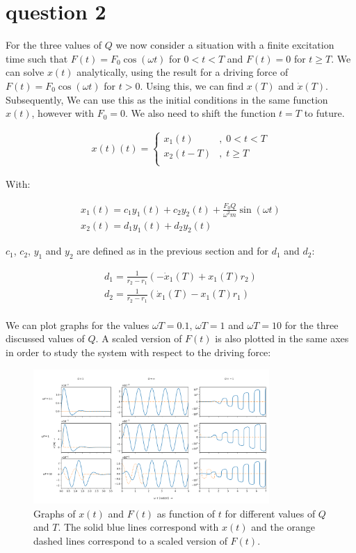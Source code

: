 \section{question 2}

For the three values of $Q$ we now consider a situation with a finite excitation time such that $F(t) = F_0 \cos(\omega t)$ for $0 < t < T$ and $F(t) = 0$ for $t \geq T$. We can solve $x(t)$ analytically, using the result for a driving force of $F(t) = F_0 \cos(\omega t)$ for $t > 0$. Using this, we can find $x(T)$ and $\dot{x}(T)$. Subsequently, We can use this as the initial conditions in the same function $x(t)$, however with $F_0 = 0$. We also need to shift the function $t=T$ to future.

\begin{align*}
	x(t)(t) = \begin{cases}
		x_1(t) & , \; 0 < t < T \\
		x_2(t-T) & , \; t \geq T \\
		\end{cases}
\end{align*}

With:

\begin{align*}
	x_1(t) = c_1 y_1(t) + c_2 y_2(t) + \frac{F_0 Q}{\omega^2 m}\sin(\omega t) \\
	x_2(t) = d_1 y_1(t) + d_2 y_2(t)
\end{align*}

$c_1$, $c_2$, $y_1$ and $y_2$ are defined as in the previous section and for $d_1$ and $d_2$:

\begin{align*}
	d_1 = \frac{1}{r_2-r_1} \left( -\dot{x}_1(T) + x_1(T) r_2 \right) \\
	d_2 = \frac{1}{r_2-r_1} \left( \dot{x}_1(T)  - x_1(T) r_1 \right) \\
\end{align*}

We can plot graphs for the values $\omega T = 0.1$, $\omega T = 1$ and $\omega T = 10$ for the three discussed values of $Q$. A scaled version of $F(t)$ is also plotted in the same axes in order to study the system with respect to the driving force:

\begin{figure}[h!]
	\centering
	\includegraphics[width=0.8\textwidth]{figures/graph_q2.png}
	\caption{Graphs of $x(t)$ and $F(t)$  as function of $t$ for different values of $Q$ and $T$. The solid blue lines correspond with $x(t)$ and the orange dashed lines correspond to a scaled version of $F(t)$.}
	\label{fig_q1}
\end{figure}

